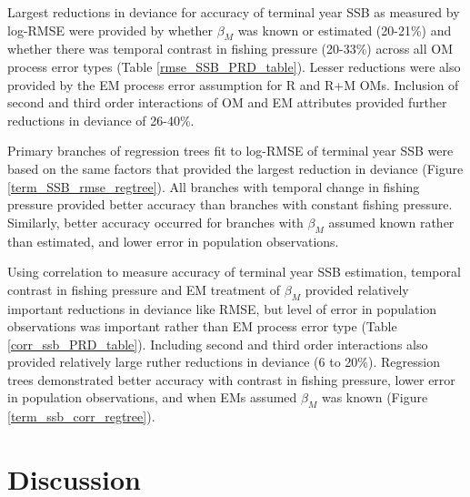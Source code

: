 \documentclass[
  12pt,
]{article}
\begin{document}
Largest reductions in deviance for accuracy of terminal year SSB as measured by log-RMSE were provided by whether \(\beta_M\) was known or estimated (20-21\%) and whether there was temporal contrast in fishing pressure (20-33\%) across all OM process error types (Table \ref{rmse_SSB_PRD_table}). Lesser reductions were also provided by the EM process error assumption for R and R+M OMs. Inclusion of second and third order interactions of OM and EM attributes provided further reductions in deviance of 26-40\%.

Primary branches of regression trees fit to log-RMSE of terminal year SSB were based on the same factors that provided the largest reduction in deviance (Figure \ref{term_SSB_rmse_regtree}). All branches with temporal change in fishing pressure provided better accuracy than branches with constant fishing pressure. Similarly, better accuracy occurred for branches with \(\beta_M\) assumed known rather than estimated, and lower error in population observations.

Using correlation to measure accuracy of terminal year SSB estimation, temporal contrast in fishing pressure and EM treatment of \(\beta_M\) provided relatively important reductions in deviance like RMSE, but level of error in population observations was important rather than EM process error type (Table \ref{corr_ssb_PRD_table}). Including second and third order interactions also provided relatively large ruther reductions in deviance (6 to 20\%). Regression trees demonstrated better accuracy with contrast in fishing pressure, lower error in population observations, and when EMs assumed \(\beta_M\) was known (Figure \ref{term_ssb_corr_regtree}).

\section*{Discussion}\label{discussion}
\end{document}
